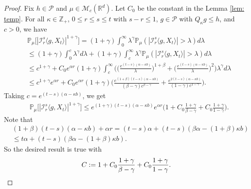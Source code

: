 \documentclass[12pt,a4paper]{amsart}
\theoremstyle{plain}
\theoremstyle{definition}
\numberwithin{equation}{section}
\begin{document}
\begin{proof}
    Fix $h \in \mathcal P$ and $\mu \in \mathcal M_c(\mathbb R^d)$. Let $C_0$ be the constant in the Lemma \ref{lem: temp}.
    For all $\kappa \in \mathbb Z_+$,  $0\leq r\leq s\leq t$ with $s-r \leq 1$,  $g\in \mathcal P$ with $Q_{\kappa} g \leq h$, and $c>0$, we have
\begin{equation}\begin{split}
&\mathbb P_\mu\big[|\mathcal I_r^s\langle g, X_t\rangle|^{1+\gamma}\big]
    = (1+\gamma)\int_0^\infty \lambda^{\gamma} \mathbb P_{\mu}(|\mathcal I_r^s\langle g, X_t\rangle|>\lambda) d\lambda
    \\&\leq (1+\gamma)\int_0^c \lambda^{\gamma} d\lambda +(1+\gamma)\int_c^\infty \lambda^{\gamma}\mathbb P_\mu(|\mathcal I_r^s\langle g, X_t\rangle|> \lambda) d\lambda
    \\& \leq c^{1+\gamma} + C_0  e^{\alpha r}(1+\gamma)\int_c^\infty \bigg(\Big(\frac{e^{(t-s)(\alpha - \kappa b)}}{\lambda}\Big)^{1+\beta}+\Big(\frac{e^{(t-s)(\alpha - \kappa b)}}{\lambda}\Big)^{2}\bigg)\lambda^{\gamma}d\lambda
    \\&\leq c^{1+\gamma} e^{\alpha r} + C_0e^{\alpha r}(1+\gamma)\Big(  \frac{e^{(1+\beta)(t-s)(\alpha- \kappa b)}}{(\beta - \gamma)c^{\beta - \gamma}}  + \frac{e^{2(t-s)(\alpha- \kappa b)}}{(1 - \gamma)c^{1 - \gamma}} \Big).
\end{split}\end{equation}
    Taking $c = e^{(t-s)(\alpha- \kappa b)}$, we get
\begin{equation}\begin{split}
    &\mathbb P_\mu\big[|\mathcal I_r^s\langle g, X_t\rangle|^{1+\gamma}\big]
    \leq e^{(1+\gamma)(t-s)(\alpha- \kappa b)} e^{\alpha r}\Big(1+ C_0 \frac{1+\gamma}{\beta - \gamma}+ C_0 \frac{1+\gamma}{1 - \gamma}\Big).
\end{split}\end{equation}
    Note that
\begin{equation}\begin{split}
    &(1+\beta)(t-s)(\alpha- \kappa b) + \alpha r
    = (t-s)\alpha+(t-s) (\beta\alpha- (1+\beta)\kappa b)
    \\&\leq t\alpha+(t-s) (\beta\alpha- (1+\beta)\kappa b).
\end{split}\end{equation}
    So the desired result is true with
\[
    C := 1+ C_0 \frac{1+\gamma}{\beta - \gamma}+ C_0 \frac{1+\gamma}{1 - \gamma}.
    \qedhere
\]
\end{proof}
\end{document}
